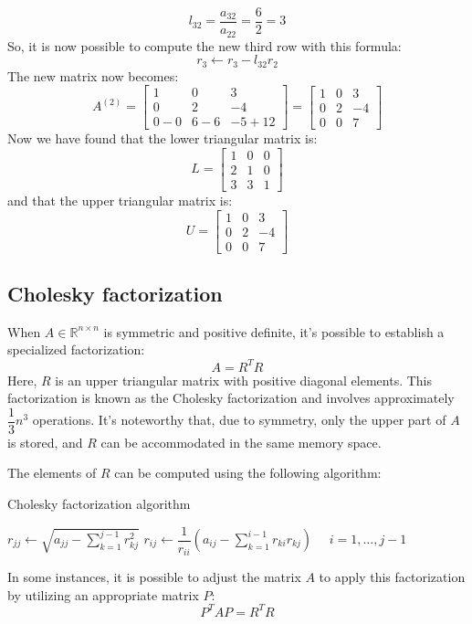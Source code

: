 \begin{example}
    \[l_{32}=\dfrac{a_{32}}{a_{22}}=\dfrac{6}{2}=3\]
    So, it is now possible to compute the new third row with this formula: 
    \[r_3 \leftarrow r_3 - l_{32}r_2\]
    The new matrix now becomes: 
    \[A^{(2)}=            
    \begin{bmatrix}
        1 & 0 & 3 \\
        0 & 2 & -4 \\
        0-0 & 6-6 & -5+12
    \end{bmatrix}=
    \begin{bmatrix}
        1 & 0 & 3 \\
        0 & 2 & -4 \\
        0 & 0 & 7
    \end{bmatrix}\]
    Now we have found that the lower triangular matrix is: 
    \[L=
    \begin{bmatrix}
        1 & 0 & 0 \\
        2 & 1 & 0 \\
        3 & 3 & 1
    \end{bmatrix}\]
    and that the upper triangular matrix is: 
    \[U=
    \begin{bmatrix}
        1 & 0 & 3 \\
        0 & 2 & -4 \\
        0 & 0 & 7
    \end{bmatrix}\]
\end{example}

\subsection*{Cholesky factorization}
When $A \in \mathbb{R}^{n \times n}$ is symmetric and positive definite, it's possible to establish a specialized factorization:
\[A=R^TR\]
Here, $R$ is an upper triangular matrix with positive diagonal elements. 
This factorization is known as the Cholesky factorization and involves approximately $\dfrac{1}{3}n^3$ operations. 
It's noteworthy that, due to symmetry, only the upper part of $A$ is stored, and $R$ can be accommodated in the same memory space.

The elements of $R$ can be computed using the following algorithm:
\begin{algorithm}[H]
    \caption{Cholesky factorization algorithm}
        \begin{algorithmic}
            \State $r_{jj}\leftarrow\sqrt{a_{jj}-\sum_{k=1}^{j-1}r_{kj}^2}$
            \State $r_{ij}\leftarrow\dfrac{1}{r_{ii}}\left(a_{ij}-\sum_{k=1}^{i-1}r_{ki}r_{kj}\right) \:\:\:\:\:\: i = 1,\dots,j-1$
        \end{algorithmic}
\end{algorithm}
In some instances, it is possible to adjust the matrix $A$ to apply this factorization by utilizing an appropriate matrix $P$:
\[P^TAP=R^TR\]

